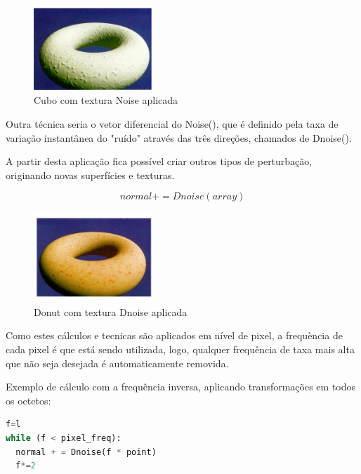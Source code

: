 \begin{figure}[H]
    \centering
    \includegraphics[width=0.4\textwidth]{img/donut3.png}
    \caption{Cubo com textura Noise aplicada}
    \label{fig:cube_noise}
\end{figure}

Outra técnica seria o vetor diferencial do Noise(), que é definido pela taxa de variação instantânea do "ruído" através das três direções, chamados de Dnoise().

A partir desta aplicação fica possível criar outros tipos de perturbação, originando novas superfícies e texturas. 

$$
normal += Dnoise(array)
$$

\begin{figure}[H]
    \centering
    \includegraphics[width=0.4\textwidth]{img/donut4.png}
    \caption{Donut com textura Dnoise aplicada}
    \label{fig:donut_dnoise}
\end{figure}

Como estes cálculos e tecnicas são aplicados em nível de pixel, a frequència de cada pixel é que está sendo utilizada, logo, qualquer frequência de taxa mais alta que não seja desejada é automaticamente removida. 

Exemplo de cálculo com a frequência inversa, aplicando transformações em todos os octetos:

\begin{lstlisting}[language=Python, caption={Pseudocódigo da função turbulence()}]
f=l
while (f < pixel_freq):
  normal + = Dnoise(f * point)
  f*=2 
\end{lstlisting}

